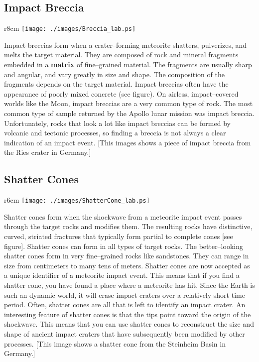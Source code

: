 \vfill

\subsection*{Impact Breccia}

\begin{wrapfigure}{r}{8cm}
\texttt{[image: ./images/Breccia\_lab.ps]}
\end{wrapfigure}

Impact breccias form when a crater--forming meteorite shatters,
pulverizes, and melts the target material.  They are composed of rock
and mineral fragments embedded in a {\bf matrix} of fine--grained
material.  The fragments are usually sharp and angular, and vary
greatly in size and shape.  The composition of the fragments depends
on the target material.  Impact breccias often have the appearance of
poorly mixed concrete (see figure).  On airless, impact--covered worlds
like the Moon, impact breccias are a very common type of rock.  The
most common type of sample returned by the Apollo lunar mission was
impact breccia.  Unfortunately, rocks that look a lot like impact
breccias can be formed by volcanic and tectonic processes, so finding
a breccia is not always a clear indication of an impact event.  [This
images shows a piece of impact breccia from the Ries crater in
Germany.]

\vfill

\clearpage

\subsection*{Shatter Cones}

\begin{wrapfigure}{r}{6cm}
\texttt{[image: ./images/ShatterCone\_lab.ps]}
\end{wrapfigure}

Shatter cones form when the shockwave from a meteorite impact event
passes through the target rocks and modifies them.  The resulting
rocks have distinctive, curved, striated fractures that typically form
partial to complete cones [see figure].  Shatter cones can form in all
types of target rocks.  The better--looking shatter cones form in very
fine--grained rocks like sandstones.  They can range in size from
centimeters to many tens of meters.  Shatter cones are now accepted as
a unique identifier of a meteorite impact event.  This means that if
you find a shatter cone, you have found a place where a meteorite has
hit.  Since the Earth is such an dynamic world, it will erase impact
craters over a relatively short time period.  Often, shatter cones are
all that is left to identify an impact crater.  An interesting feature
of shatter cones is that the tips point toward the origin of the
shockwave.  This means that you can use shatter cones to reconstruct
the size and shape of ancient impact craters that have subsequently
been modified by other processes.  [This image shows a shatter cone
from the Steinheim Basin in Germany.]

